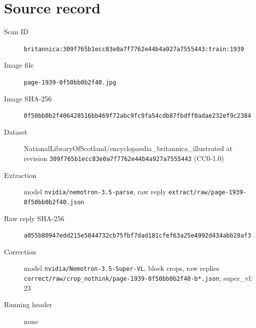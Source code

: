 \documentclass{article}
\begin{document}
\section*{Source record}
\begin{description}
\item[Scan ID] \texttt{britannica:309f765b1ecc83e0a7f7762e44b4a927a7555443:train:1939}
\item[Image file] \texttt{page-1939-0f50bb0b2f40.jpg}
\item[Image SHA-256] \texttt{0f50bb0b2f406428516bb469f72abc9fc9fa54cdb87fbdff0adae232ef9c2384}
\item[Dataset] NationalLibraryOfScotland/encyclopaedia\_britannica\_illustrated at revision \texttt{309f765b1ecc83e0a7f7762e44b4a927a7555443} (CC0-1.0)
\item[Extraction] model \texttt{nvidia/nemotron-3.5-parse}, raw reply \texttt{extract/raw/page-1939-0f50bb0b2f40.json}
\item[Raw reply SHA-256] \texttt{a055b80947edd215e5844732cb75fbf7dad181cfef63a25e4992d434abb28af3}
\item[Correction] model \texttt{nvidia/Nemotron-3.5-Super-VL}, block crops, raw replies \texttt{correct/raw/crop\_nothink/page-1939-0f50bb0b2f40-b*.json}; super\_vl: 23
\item[Running header] none
\end{description}
\end{document}
